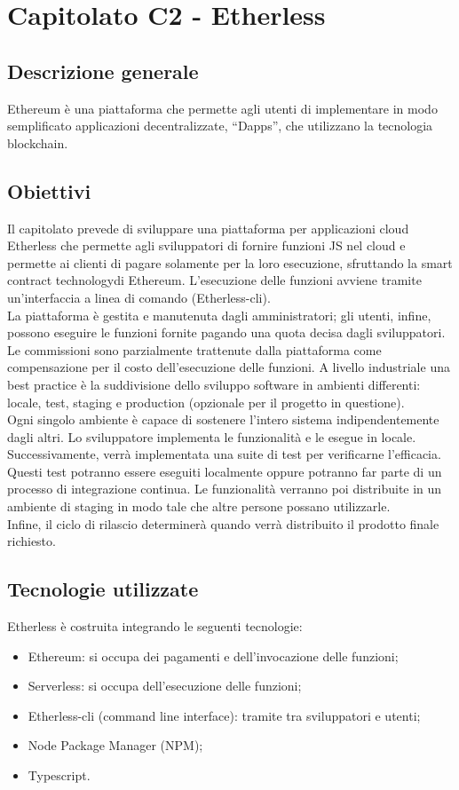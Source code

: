 \section{Capitolato C2 - Etherless}

\subsection{Descrizione generale}
Ethereum è una piattaforma che permette agli utenti di implementare in modo semplificato applicazioni decentralizzate, “Dapps”, che utilizzano la tecnologia blockchain\glo.

\subsection{Obiettivi}
Il capitolato prevede di sviluppare una piattaforma per applicazioni cloud Etherless che permette agli sviluppatori di fornire funzioni JS nel cloud e permette ai clienti di pagare solamente per la loro esecuzione, sfruttando la smart contract technology\glo di Ethereum\glo.
L’esecuzione delle funzioni avviene tramite un’interfaccia a linea di comando (Etherless-cli). \\
La piattaforma è gestita e manutenuta dagli amministratori; gli utenti, infine, possono eseguire le funzioni fornite pagando una quota decisa dagli sviluppatori. \\
Le commissioni sono parzialmente trattenute dalla piattaforma come compensazione per il costo dell’esecuzione delle funzioni. 
A livello industriale una best practice è la suddivisione dello sviluppo software in ambienti differenti: locale, test, staging e production (opzionale per il progetto in questione). \\
Ogni singolo ambiente è capace di sostenere l’intero sistema indipendentemente dagli altri. Lo sviluppatore implementa le funzionalità e le esegue in locale. \\
Successivamente, verrà implementata una suite di test per verificarne l’efficacia. Questi test potranno essere eseguiti localmente oppure potranno far parte di un processo di integrazione continua. Le funzionalità verranno poi distribuite in un ambiente di staging in modo tale che altre persone possano utilizzarle. \\
Infine, il ciclo di rilascio determinerà quando verrà distribuito il prodotto finale richiesto.


\subsection{Tecnologie utilizzate}
Etherless è costruita integrando le seguenti tecnologie:
\begin{itemize}
\item Ethereum: si occupa dei pagamenti e dell’invocazione delle funzioni;
\item Serverless: si occupa dell’esecuzione delle funzioni;
\item Etherless-cli (command line interface): tramite tra sviluppatori e utenti;
\item Node Package Manager (NPM\glo);
\item Typescript\glo.
\end{itemize}


